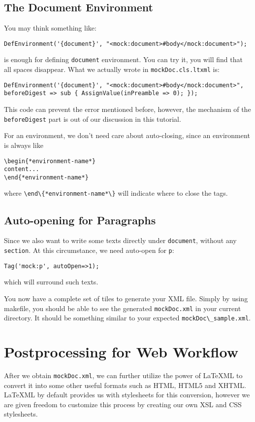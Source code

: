 \documentclass[a4paper]{article}
\def\latexml{{\LaTeX}ML\xspace}
\begin{document}
\subsection{The Document Environment}
You may think something like:
\begin{lstlisting}
DefEnvironment('{document}', "<mock:document>#body</mock:document>");
\end{lstlisting}
is enough for defining \lstinline|document| environment. You can try it, you will find that all spaces disappear. What we actually wrote in \lstinline|mockDoc.cls.ltxml| is:
\begin{lstlisting}
DefEnvironment('{document}', "<mock:document>#body</mock:document>", beforeDigest => sub { AssignValue(inPreamble => 0); });
\end{lstlisting}
This code can prevent the error mentioned before, however, the mechanism of the \lstinline|beforeDigest| part is out of our discussion in this tutorial.

 For an environment, we don't need care about auto-closing, since an environment is always like
\begin{lstlisting}
\begin{*environment-name*}
content...
\end{*environment-name*}
\end{lstlisting}
where \lstinline|\end\{*environment-name*\}| will indicate where to close the tags.

\subsection{Auto-opening for Paragraphs}
Since we also want to write some texts directly under \lstinline|document|, without any \lstinline|section|. At this circumstance, we need auto-open for \lstinline|p|:
\begin{lstlisting}
Tag('mock:p', autoOpen=>1);
\end{lstlisting}
which will surround such texts.

You now have a complete set of tiles to generate your XML file. Simply by using makefile, you should be able to see the generated \lstinline|mockDoc.xml| in your current directory. It should be something similar to your expected
\lstinline|mockDoc\_sample.xml|.

\section{Postprocessing for Web Workflow}
After we obtain \lstinline|mockDoc.xml|, we can further utilize the power of \latexml to convert it into some other
useful formats such as HTML, HTML5 and XHTML. \latexml by default provides us with stylesheets for this conversion, however we are given freedom to customize this process by creating our own XSL and CSS stylesheets.
\end{document}
